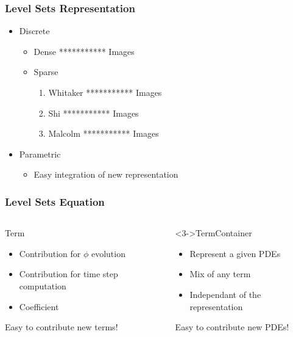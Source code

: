 \begin{frame}
\frametitle{Level Sets Representation}
\begin{itemize}
  \item Discrete
  \begin{itemize}
    \item Dense     *********** Images
    \item Sparse 
    \begin{enumerate}
      \item Whitaker  *********** Images 
      \item Shi       *********** Images 
      \item Malcolm   *********** Images 
    \end{enumerate}
  \end{itemize}
  \item Parametric
  \begin{itemize}
    \item Easy integration of new representation
  \end{itemize}
\end{itemize}
\end{frame}


\begin{frame}
\frametitle{Level Sets Equation}

\begin{columns}
  \begin{block}{Term}
    \begin{itemize}
      \item Contribution for $\phi$ evolution
      \item Contribution for time step computation
      \item Coefficient
    \end{itemize} 
  \alert<2->{Easy to contribute new terms!}
  \end{block}

  \begin{block}<3->{TermContainer}
    \begin{itemize}
      \item Represent a given PDEs
      \item Mix of any term
      \item Independant of the representation
    \end{itemize}
  \alert<4->{Easy to contribute new PDEs!}
  \end{block}

\end{columns}

\end{frame}

